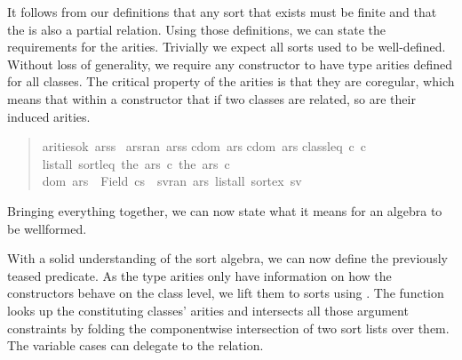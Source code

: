 
It follows from our definitions that any sort that exists must be finite and that the  is also a partial relation.
Using those definitions, we can state the requirements for the arities.
Trivially we expect all sorts used to be well-defined.
Without loss of generality, we require any constructor to have type arities defined for all classes.
The critical property of the arities is that they are coregular, which means that within a constructor that if two classes are related, so are their induced arities.

\begin{quote}
\begin{isabelle}
 arities{\isacharunderscore}ok\ arss\ {\isacharequal}\isanewline
{\isacharparenleft}{\isasymforall}ars{\isasymin}ran\ arss{\isachardot}\isanewline
\isaindent{{\isacharparenleft}\ \ \ }{\isacharparenleft}{\isasymforall}cdom\ ars{\isachardot}\isanewline
\isaindent{{\isacharparenleft}\ \ \ {\isacharparenleft}\ \ \ }{\isasymforall}cdom\ ars{\isachardot}\isanewline
\isaindent{{\isacharparenleft}\ \ \ {\isacharparenleft}\ \ \ \ \ \ }class{\isacharunderscore}leq\ c\ c\ {\isasymlongrightarrow}\isanewline
\isaindent{{\isacharparenleft}\ \ \ {\isacharparenleft}\ \ \ \ \ \ }list{\isacharunderscore}all{}\ sort{\isacharunderscore}leq\ {\isacharparenleft}the\ {\isacharparenleft}ars\ c\ {\isacharparenleft}the\ {\isacharparenleft}ars\ c\ {\isasymand}\isanewline
\isaindent{{\isacharparenleft}\ \ \ }dom\ ars\ {\isacharequal}\ Field\ cs\ {\isasymand}\ {\isacharparenleft}{\isasymforall}sv{\isasymin}ran\ ars{\isachardot}\ list{\isacharunderscore}all\ sort{\isacharunderscore}ex\ sv{\isacharparenright}{\isacharparenright}%
\end{isabelle}
\end{quote}

Bringing everything together, we can now state what it means for an algebra to be wellformed.


With a solid understanding of the sort algebra, we can now define the previously teased  predicate.
As the type arities only have information on how the constructors behave on the class level, we lift them to sorts using .
The function looks up the constituting classes' arities and intersects all those argument constraints by folding the componentwise intersection of two sort lists over them.
The variable cases can delegate to the  relation.

